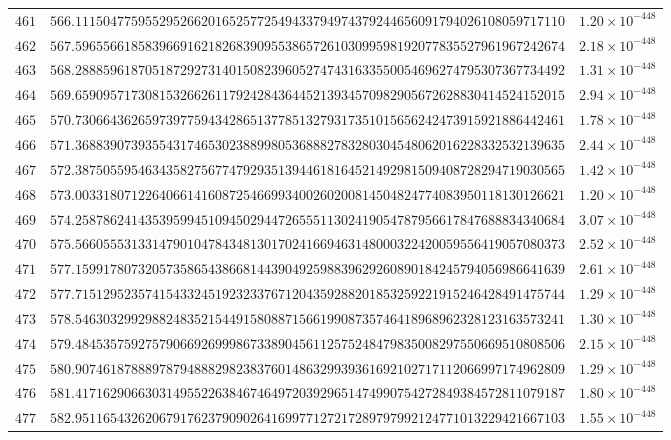 \documentclass[12pt,reqno]{amsart}
\theoremstyle{remark}
\begin{document}
\begin{longtable}{clc}
$461$ & $566.1115047759552952662016525772549433794974379244656091794026108059717110$ & $1.20\times 10^{-448}$ \\
$462$ & $567.5965566185839669162182683909553865726103099598192077835527961967242674$ & $2.18\times 10^{-448}$ \\
$463$ & $568.2888596187051872927314015082396052747431633550054696274795307367734492$ & $1.31\times 10^{-448}$ \\
$464$ & $569.6590957173081532662611792428436445213934570982905672628830414524152015$ & $2.94\times 10^{-448}$ \\
$465$ & $570.7306643626597397759434286513778513279317351015656242473915921886442461$ & $1.78\times 10^{-448}$ \\
$466$ & $571.3688390739355431746530238899805368882783280304548062016228332532139635$ & $2.44\times 10^{-448}$ \\
$467$ & $572.3875055954634358275677479293513944618164521492981509408728294719030565$ & $1.42\times 10^{-448}$ \\
$468$ & $573.0033180712264066141608725466993400260200814504824774083950118130126621$ & $1.20\times 10^{-448}$ \\
$469$ & $574.2587862414353959945109450294472655511302419054787956617847688834340684$ & $3.07\times 10^{-448}$ \\
$470$ & $575.5660555313314790104784348130170241669463148000322420059556419057080373$ & $2.52\times 10^{-448}$ \\
$471$ & $577.1599178073205735865438668144390492598839629260890184245794056986641639$ & $2.61\times 10^{-448}$ \\
$472$ & $577.7151295235741543324519232337671204359288201853259221915246428491475744$ & $1.29\times 10^{-448}$ \\
$473$ & $578.5463032992988248352154491580887156619908735746418968962328123163573241$ & $1.30\times 10^{-448}$ \\
$474$ & $579.4845357592757906692699986733890456112575248479835008297550669510808506$ & $2.15\times 10^{-448}$ \\
$475$ & $580.9074618788897879488829823837601486329939361692102717112066997174962809$ & $1.29\times 10^{-448}$ \\
$476$ & $581.4171629066303149552263846746497203929651474990754272849384572811079187$ & $1.80\times 10^{-448}$ \\
$477$ & $582.9511654326206791762379090264169977127217289797992124771013229421667103$ & $1.55\times 10^{-448}$ \\

\end{longtable}
\end{document}
